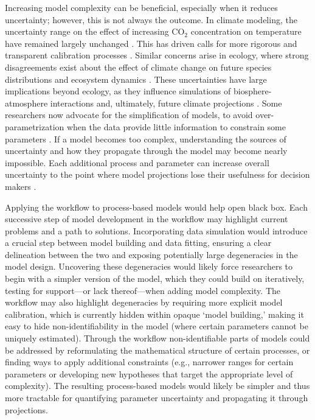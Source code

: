 \documentclass[11pt]{article}
\begin{document}
Increasing model complexity can be beneficial, especially when it reduces uncertainty; however, this is not always the outcome. In climate modeling, the uncertainty range on the effect of increasing CO$_{2}$ concentration on temperature have remained largely unchanged \citep{Zelinka2020}. This has driven calls for more rigorous and transparent calibration processes \citep{balaji2022general}. Similar concerns arise in ecology, where strong disagreements exist about the effect of climate change on future species distributions \citep{Cheaib2012} and ecosystem dynamics \citep{Lovenduski2017}.
These uncertainties have large implications beyond ecology, as they influence simulations of biosphere-atmosphere interactions and, ultimately, future climate projections \citep{Bonan2018, simpson2025confronting}.
Some researchers now advocate for the simplification of models, to avoid over-parametrization when the data provide little information to constrain some parameters \citep{Wang2017, Harrison2021}. If a model becomes too complex, understanding the sources of uncertainty and how they propagate through the model may become nearly impossible.
Each additional process and parameter can increase overall uncertainty to the point where model projections lose their usefulness for decision makers \citep{Saltelli2020}.

Applying the workflow to process-based models would help open black box. Each successive step of model development in the workflow may highlight current problems and a path to solutions. Incorporating data simulation would introduce a crucial step between model building and data fitting, ensuring a clear delineation between the two and exposing potentially large degeneracies in the model design. Uncovering these degeneracies would likely force researchers to begin with a simpler version of the model, which they could build on iteratively, testing for support---or lack thereof---when adding model complexity. The workflow may also highlight degeneracies by requiring more explicit model calibration, which is currently hidden within opaque `model building,' making it easy to hide non-identifiability in the model (where certain parameters cannot be uniquely estimated). Through the workflow non-identifiable parts of models could be addressed by reformulating the mathematical structure of certain processes, or finding ways to apply additional constraints (e.g., narrower ranges for certain parameters or developing new hypotheses that target the appropriate level of complexity). The resulting process-based models would likely be simpler and thus more tractable for quantifying parameter uncertainty and propagating it through projections. 
\end{document}
